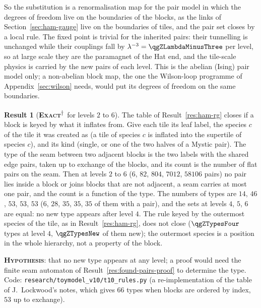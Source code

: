 \documentclass[11pt]{article}
\newcommand{\exact}{\textbf{\textsc{Exact}}}
\newcommand{\hypo}{\textbf{\textsc{Hypothesis}}}
\newcommand{\snap}{\textsuperscript{$\dagger$}}      %
\theoremstyle{definition}
\newtheorem{result}{Result}
\begin{document}
So the substitution is a renormalisation map for the pair model in which the degrees of freedom live on the boundaries of the blocks, as the links of Section~\ref{sec:ham-gauge} live on the boundaries of tiles, and the pair set closes by a local rule. The fixed point is trivial for the inherited pairs: their tunnelling is unchanged while their couplings fall by $\lambda^{-3}=\qgZLambdaMinusThree$ per level, so at large scale they are the paramagnet of the Hat end, and the tile-scale physics is carried by the new pairs of each level. This is the abelian (Ising) pair model only; a non-abelian block map, the one the Wilson-loop programme of Appendix~\ref{sec:wilson} needs, would put its degrees of freedom on the same boundaries.

\begin{result}[\exact\snap\ for levels $2$ to $6$]\label{res:ham-rg-closed}
The table of Result~\ref{res:ham-rg} closes if a block is keyed by what it inflates from. Give each tile its leaf label, the species $c$ of the tile it was created as (a tile of species $c$ is inflated into the supertile of species $c$), and its kind (single, or one of the two halves of a Mystic pair). The type of the seam between two adjacent blocks is the two labels with the shared edge pairs, taken up to exchange of the blocks, and its count is the number of flat pairs on the seam. Then at levels $2$ to $6$ ($6$, $82$, $804$, $7012$, $58106$ pairs) no pair lies inside a block or joins blocks that are not adjacent, a seam carries at most one pair, and the count is a function of the type. The numbers of types are $14$, $46$, $53$, $53$, $53$ ($6$, $28$, $35$, $35$, $35$ of them with a pair), and the sets at levels $4$, $5$, $6$ are equal: no new type appears after level $4$. The rule keyed by the outermost species of the tile, as in Result~\ref{res:ham-rg}, does not close ($\qgZTypesFour$ types at level $4$, $\qgZTypesNew$ of them new); the outermost species is a position in the whole hierarchy, not a property of the block.
\end{result}
\hypo: that no new type appears at any level; a proof would need the finite seam automaton of Result~\ref{res:found-pairs-proof} to determine the type. Code: \texttt{research/toymodel\_v10/t10\_rules.py} (a re-implementation of the table of J.~Lockwood's notes, which gives $66$ types when blocks are ordered by index, $53$ up to exchange).

\end{document}
